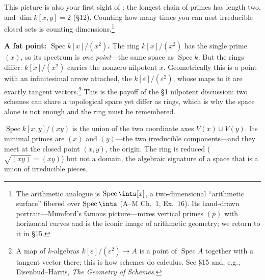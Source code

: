 \documentclass[11pt]{article}
\DeclareMathOperator{\Spec}{Spec}
\begin{document}
\begin{center}
\end{center}

This picture is also your first sight of : the longest chain of primes has
length two, and $\dim k[x,y]=2$ (\S12). Counting how many times you can nest irreducible closed
sets is counting dimensions.\footnote{The arithmetic analogue is $\Spec\ints[x]$, a
two-dimensional ``arithmetic surface'' fibered over $\Spec\ints$ (A--M Ch.~1, Ex.~16). Its
hand-drawn portrait---Mumford's famous picture---mixes vertical primes $(p)$ with horizontal
curves and is the iconic image of arithmetic geometry; we return to it in \S15.}

\textbf{A fat point: $\Spec k[x]/(x^2)$.} The ring $k[x]/(x^2)$ has the single prime $(x)$, so
its spectrum is \emph{one point}---the same space as $\Spec k$. But the rings differ: $k[x]/(x^2)$
carries the nonzero nilpotent $x$. Geometrically this is a point with an infinitesimal arrow
attached, the  $k[\varepsilon]/(\varepsilon^2)$, whose maps to it are
exactly tangent vectors.\footnote{A map of $k$-algebras $k[\varepsilon]/(\varepsilon^2)\to A$
is a point of $\Spec A$ together with a tangent vector there; this is how schemes do
calculus. See \S15 and, e.g., Eisenbud--Harris, \emph{The Geometry of Schemes}.} This is the
payoff of the \S1 nilpotent discussion: two schemes can share a topological space yet differ as
rings, which is why the space alone is not enough and the ring must be remembered.

\begin{eexample}
$\Spec k[x,y]/(xy)$ is the union of the two coordinate axes $V(x)\cup V(y)$. Its minimal primes
are $(x)$ and $(y)$---the two irreducible components---and they meet at the closed point
$(x,y)$, the origin. The ring is reduced ($\sqrt{(xy)}=(xy)$) but not a domain, the algebraic
signature of a space that is a union of irreducible pieces.
\end{eexample}
\end{document}
